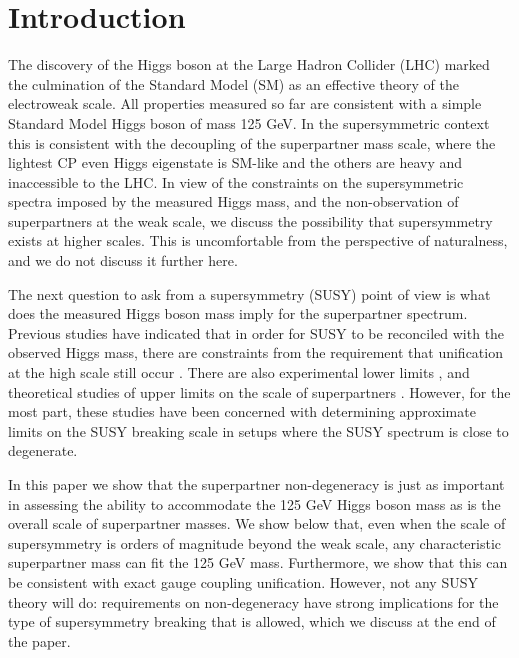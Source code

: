 \documentclass[12pt]{article}
\begin{document}
\newpage

\tableofcontents



\section{Introduction}

The discovery of the Higgs boson at the Large Hadron Collider (LHC) \cite{Aad:2012tfa, Chatrchyan:2012xdj} marked the culmination of the Standard Model (SM) as an effective theory of the electroweak scale. All properties measured so far are consistent with a simple Standard Model Higgs boson of mass 125 GeV. In the supersymmetric context this is consistent with the decoupling of the superpartner mass scale, where the lightest CP even Higgs eigenstate is SM-like and the others are heavy and inaccessible to the LHC. 
In view of the constraints on the supersymmetric spectra imposed by the measured Higgs mass, and the non-observation of superpartners at the weak scale, we discuss the possibility that supersymmetry exists at higher scales. This is uncomfortable from the perspective of naturalness, and we do not discuss it further here.

The next question to ask from a supersymmetry (SUSY) point of view is what does the measured Higgs boson mass imply for the superpartner spectrum. Previous studies have indicated that in order for SUSY to be reconciled with the observed Higgs mass, there are constraints from the requirement that unification at the high scale still occur \cite{Hall:2013eko, Hebecker:2014uaa, Hall:2014vga, Staub:2017jnp}. There are also experimental lower limits \cite{ATLAS-CONF-2017-022, ATLAS-CONF-2017-030, Sirunyan:2017cwe, Sirunyan:2017kqq}, and theoretical studies of upper limits on the scale of superpartners \cite{Carena:1995bx, Haber:1996fp, Bernal:2007uv, Giudice:2011cg, Ellis:2012aa, Cao:2012fz,Ibanez:2013gf,Djouadi:2013vqa, Bagnaschi:2014rsa, Hebecker:2014uaa, Lee:2015uza, Vega:2015fna}. However, for the most part, these studies have been concerned with determining approximate limits on the SUSY breaking scale in setups where the SUSY spectrum is close to degenerate. 

In this paper we show that the superpartner non-degeneracy is just as important in assessing the ability to accommodate the 125 GeV Higgs boson mass as is the overall scale of superpartner masses. We show below that, even when the scale of supersymmetry is orders of magnitude beyond the weak scale, any characteristic superpartner mass can fit the 125 GeV mass. Furthermore, we show that this can be consistent with exact gauge coupling unification. However, not any SUSY theory will do: requirements on non-degeneracy have strong implications for the type of supersymmetry breaking that is allowed, which we discuss at the end of the paper.
\end{document}

